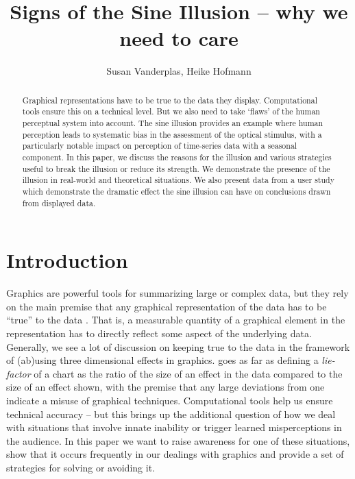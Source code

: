 \documentclass[12pt]{article}\usepackage[]{graphicx}\usepackage[]{color}
\title{Signs of the Sine Illusion -- why we need to care}
\author{Susan Vanderplas, Heike Hofmann}
\begin{document}
\maketitle
\begin{abstract}
Graphical representations have to be true to the data they display. Computational tools ensure this on a technical level. But we also need to take `flaws' of the human perceptual system into account. The sine illusion provides an example where human perception leads to systematic bias in the assessment of the optical stimulus, with a particularly notable impact on perception of time-series data with a seasonal component. In this paper, we discuss the reasons for the illusion and various strategies  useful to break the illusion or reduce its strength. We demonstrate the presence of the illusion in real-world and theoretical situations. We also present data from a user study which demonstrate the dramatic effect the sine illusion can have on conclusions drawn from displayed data.
\end{abstract}



\section{Introduction}
Graphics are powerful tools for summarizing large or complex data, but they rely on the main premise that any graphical representation of the data has to be ``true'' to the data \citep[see e.g.][]{tufte, wainer:2000, robbins:2005}. That is, a measurable quantity of a graphical element in the representation has to  directly reflect some aspect of the underlying data. Generally, we see a lot of discussion on keeping true to the data in the framework of (ab)using three dimensional effects in graphics. \citep{tufte} goes as far as defining a {\it lie-factor} of a chart as the ratio of the size of an effect in the data compared to the size of an effect shown, with the premise that any large deviations from one indicate a misuse of graphical techniques. Computational tools help us ensure technical accuracy -- but this brings up the additional question of how we deal with situations that involve innate inability or trigger learned misperceptions in the audience. In this paper we want to raise awareness for one of these situations, show that it occurs frequently in our dealings with graphics and provide a set of strategies for solving or avoiding it.
\end{document}
